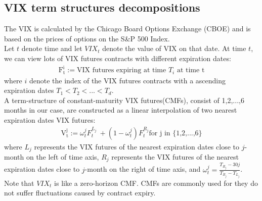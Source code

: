 \documentclass[10pt,letterpaper]{article}
\begin{document}
\subsection*{VIX term structures decompositions}
The VIX is calculated by the Chicago Board Options Exchange (CBOE) and is based on the prices of options on the S\&P 500 Index.
\\Let $t$ denote time and let $VIX_t$ denote the value of VIX on that date. At time $t$,
we can view lots of VIX futures contracts with different expiration dates:
\begin{eqnarray}
    \mathrm{F^i_t} := \text{VIX futures expiring at time $T_i$ at time t}
\end{eqnarray}
where $i$ denote the index of the VIX futures contracts with a ascending expiration dates $T_1 < T_2 < ... < T_d$.
\\A term-structure of constant-maturity VIX futures(CMFs), consist of 1,2,...,6 months in our case, are constructed as
a linear interpolation of two nearest expiration dates VIX futures:
\begin{eqnarray}
\label{eq:defineV}
    \mathrm{V^j_t} := \omega^j_tF^{L_j}_t\ + (1 - \omega^j_t)F^{R_j}_t \text{for j in \{1,2,...,6\}}
\end{eqnarray}
where $L_j$ represents the VIX futures of the nearest expiration dates close to $j$-month on the left of time axis,
$R_j$ represents the VIX futures of the nearest expiration dates close to $j$-month on the right of time axis, and
$\omega^j_t = \frac{T_{R_j} - 30j}{T_{R_j} - T_{L_j}}$. Note that $VIX_t$ is like a zero-horizon CMF.
CMFs are commonly used for they do not suffer fluctuations caused by contract expiry.
\end{document}
